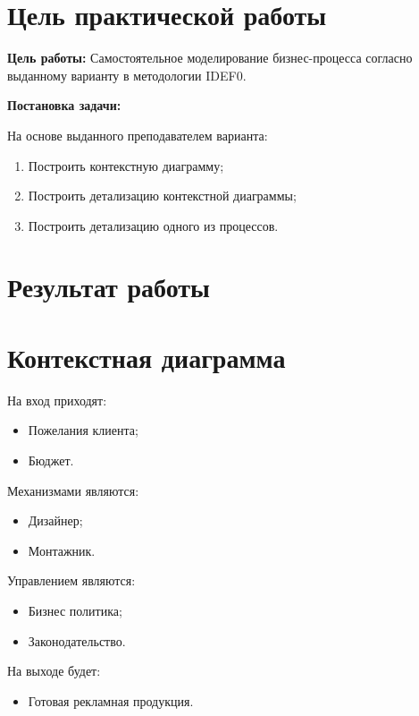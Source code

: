 \section*{\LARGE Цель практической работы}

\textbf{Цель работы:} Самостоятельное моделирование бизнес-процесса согласно выданному варианту в методологии IDEF0.



\textbf{Постановка задачи:}\par
На основе выданного преподавателем варианта:

\begin{enumerate}
	\item Построить контекстную диаграмму;
	\item Построить детализацию контекстной диаграммы;
	\item Построить детализацию одного из процессов.
\end{enumerate}


\newpage

\section*{\LARGE Результат работы}

\section{Контекстная диаграмма}

На вход приходят:
\begin{itemize}
	\item Пожелания клиента;
	\item Бюджет.
\end{itemize}

Механизмами являются:
\begin{itemize}
	\item Дизайнер;
	\item Монтажник.
\end{itemize}

Управлением являются:
\begin{itemize}
	\item Бизнес политика;
	\item Законодательство.
\end{itemize}

На выходе будет:
\begin{itemize}
	\item Готовая рекламная продукция.
\end{itemize}


